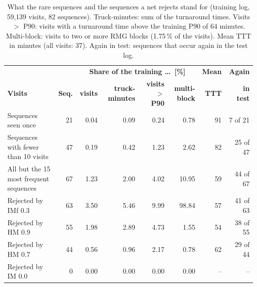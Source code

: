 \begin{table}[htbp]
\centering
\footnotesize
\setlength{\tabcolsep}{3pt}
\begin{tabular}{lrrrrrrr}
\toprule
 & & \multicolumn{4}{c}{\textbf{Share of the training \ldots\ [\%]}} & \textbf{Mean} & \textbf{Again} \\
\textbf{Visits} & \textbf{Seq.} & \textbf{visits} & \textbf{truck-minutes} & \textbf{visits $>$ P90} & \textbf{multi-block} & \textbf{TTT} & \textbf{in test} \\
\midrule
Sequences seen once & 21 & 0.04 & 0.09 & 0.24 & 0.78 & 91 & 7 of 21 \\
Sequences with fewer than 10 visits & 47 & 0.19 & 0.42 & 1.23 & 2.62 & 82 & 25 of 47 \\
All but the 15 most frequent sequences & 67 & 1.23 & 2.00 & 4.02 & 10.95 & 59 & 44 of 67 \\
\midrule
Rejected by IMf 0.3 & 63 & 3.50 & 5.46 & 9.99 & 98.84 & 57 & 41 of 63 \\
Rejected by HM 0.9 & 55 & 1.98 & 2.89 & 4.73 & 1.55 & 54 & 38 of 55 \\
Rejected by HM 0.7 & 44 & 0.56 & 0.96 & 2.17 & 0.78 & 62 & 29 of 44 \\
Rejected by IM 0.0 & 0 & 0.00 & 0.00 & 0.00 & 0.00 & -- & -- \\
\bottomrule
\end{tabular}
\caption{What the rare sequences and the sequences a net rejects stand for (training log, 59,139 visits, 82 sequences). Truck-minutes: sum of the turnaround times. Visits $>$ P90: visits with a turnaround time above the training P90 of 64 minutes. Multi-block: visits to two or more RMG blocks (1.75\,\% of the visits). Mean TTT in minutes (all visits: 37). Again in test: sequences that occur again in the test log.}
\label{tab:rq1_tail_relevance}
\end{table}

